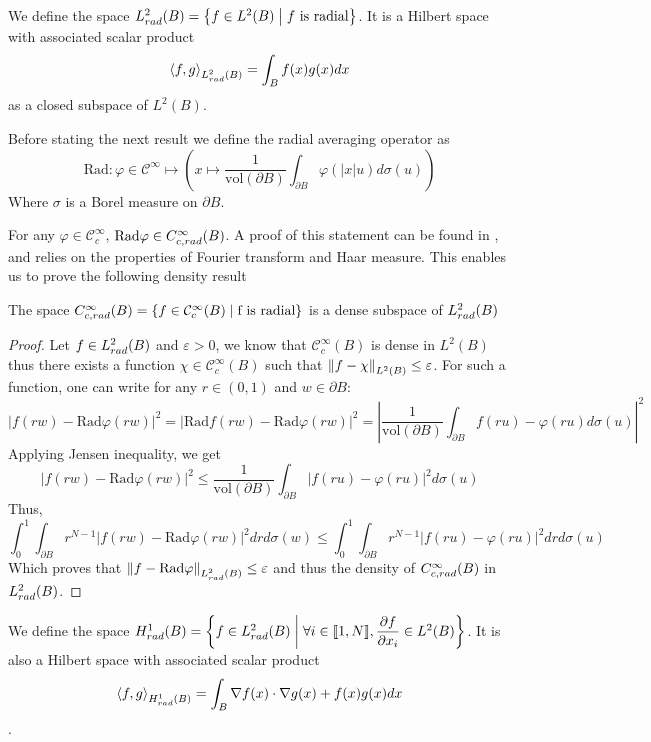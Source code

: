 \documentclass[11pt,a4paper]{article}
\begin{document}
\begin{Def} We define the space $L^2_{rad}(B) = \left\{f \in L^2(B)\mathrel{}\middle|\mathrel{} f \text{ is radial}\right\}$. It is a Hilbert space with associated scalar product \[\left\langle f,g\right\rangle_{L^2_{rad}(B)} = \int_{B}f(x)g(x)dx\]
as a closed subspace of $L^2(B)$.
\end{Def}

Before stating the next result we define the radial averaging operator as \[\text{Rad} : \varphi\in \mathcal{C}^{\infty} \mapsto \left(x\mapsto\displaystyle \frac{1}{\text{vol}\left(\partial B\right)}\int_{\partial B}\varphi(|x|u)d\sigma(u) \right)\]
Where $\sigma$ is a Borel measure on $\partial B$. 

For any $\varphi \in \mathcal{C}_c^{\infty}$, $\text{Rad}\varphi \in C^\infty_{c,rad}(B)$. A proof of this statement can be found in \cite{SphericalAverage}, and relies on the properties of Fourier transform and Haar measure.
This enables us to prove the following density result
\begin{Prop} The space $C^\infty_{c,rad}(B) = \left\{f \in \mathcal{C}_c^\infty(B)\mathrel{}\middle|\mathrel{}\text{f is radial}\right\}$ is a dense subspace of $L^2_{rad}(B)$

\end{Prop}
\begin{proof}
Let $f \in L^2_{rad}(B)$ and $\varepsilon >0$, we know that $\mathcal{C}_c^\infty(B)$ is dense in $L^2(B)$ thus there exists a function $\chi \in \mathcal{C}_c^\infty(B)$ such that $\left\|f - \chi\right\|_{L^2(B)} \leq \varepsilon$. For such a function, one can write for any $r \in (0,1)$ and $w \in \partial B : $\[\left|f(rw) - \text{Rad}\varphi(rw)\right|^2 = \left|\text{Rad} f(rw) - \text{Rad}\varphi(rw)\right|^2 = \left|\frac{1}{\text{vol}\left(\partial B\right)} \int_{\partial B}f(ru) - \varphi(ru)d\sigma(u) \right|^2 \]
Applying Jensen inequality, we get \[\left|f(rw) - \text{Rad}\varphi(rw)\right|^2 \leq \frac{1}{\text{vol}\left(\partial B\right)} \int_{\partial B}\left|f(ru) - \varphi(ru) \right|^2 d\sigma(u)\]
Thus, \[ \int_{0}^1 \int_{\partial B} r^{N-1}\left| f(rw) - \text{Rad}\varphi(rw)\right|^2 dr d\sigma(w) \leq \int_{0}^1 \int_{\partial B} r^{N-1}\left| f(ru) - \varphi(ru)\right|^2 dr d\sigma(u)\]
Which proves that $\left\|f - \text{Rad}\varphi\right\|_{L^2_{rad}(B)} \leq \varepsilon$ and thus the density of $C^\infty_{c,rad}(B)$ in $L^2_{rad}(B)$.  
\end{proof}
\begin{Def} We define the space $H^1_{rad}(B) = \left\{f \in L^2_{rad}(B)\mathrel{}\middle|\mathrel{}\forall i\in \llbracket 1,N \rrbracket, \dfrac{\partial f}{\partial x_i}\in L^2(B)\right\}$. It is also a Hilbert space with associated scalar product \[\left\langle f,g\right\rangle_{H^1_{rad}(B)} = \int_{B} \nabla f(x) \cdot \nabla g(x) + f(x)g(x)dx\]. 
\end{Def}
\end{document}
